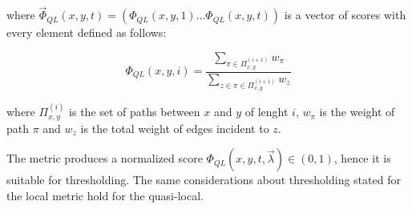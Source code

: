 where $\vec{\Phi}_{QL}(x,y,t)=(\Phi_{QL}(x,y,1)\ldots\Phi_{QL}(x,y,t))$ is a vector of scores with every element defined as follows:


%

\begin{equation}
\label{eqn:detection-quasi-local-3}
\Phi_{QL}(x,y,i)=
\frac{\sum\limits_{\pi\in\Pi_{x,y}^{(i+1)}}w_{\pi}}
{\sum\limits_{z\in\pi\in\Pi_{x,y}^{(i+1)}}w_{z}}
\end{equation}

where $\Pi_{x,y}^{(i)}$ is the set of paths between $x$ and $y$ of lenght $i$,
$w_{\pi}$ is the weight of path $\pi$ and
$w_{z}$ is the total weight of edges incident to $z$.

The metric produces a normalized score $\Phi_{QL}(x,y,t,\vec{\lambda})\in(0,1)$, hence it is suitable for thresholding. The same considerations about thresholding stated for the local metric hold for the quasi-local.


